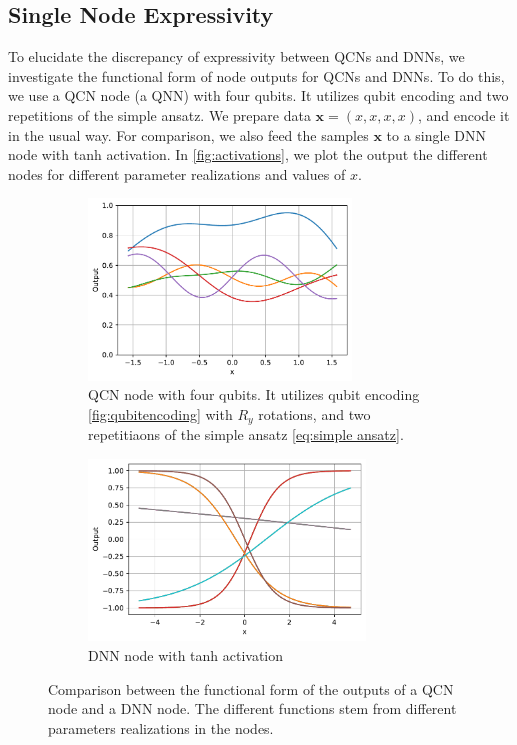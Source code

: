 \subsection{Single Node Expressivity}\label{sec:Single Node Expressivity}
To elucidate the discrepancy of expressivity between QCNs and DNNs, we investigate the functional form of node outputs for QCNs and DNNs. To do this, we use a QCN node (a QNN) with four qubits. It utilizes qubit encoding and two repetitions of the simple ansatz. We prepare data $\boldsymbol{x} = (x, x, x, x)$, and encode it in the usual way. For comparison, we also feed the samples $\boldsymbol{x}$ to a single DNN node with tanh activation. In \autoref{fig:activations}, we plot the output the different nodes for different parameter realizations and values of $x$.

\begin{figure}[H]
    \centering
    \begin{subfigure}[t]{0.5\textwidth}
        \centering
        \includegraphics[height=1.9in]{latex/figures/activation_qnn_4.pdf}
        \caption{QCN node with four qubits. It utilizes qubit encoding \autoref{fig:qubitencoding} with $R_y$ rotations, and two repetitiaons of the simple ansatz \autoref{eq:simple ansatz}.}
        \label{fig:activations tensorial}
    \end{subfigure}%
    \hfill 
    \begin{subfigure}[t]{0.5\textwidth}
        \centering
        \includegraphics[height=1.9in]{latex/figures/activation_dnn.pdf}
        \caption{DNN node with tanh activation}
        \label{fig:activations DNN}
    \end{subfigure}%
    \caption{Comparison between the functional form of the outputs of a QCN node and a DNN node. The different functions stem from different parameters realizations in the nodes.}
    \label{fig:activations}
\end{figure}

